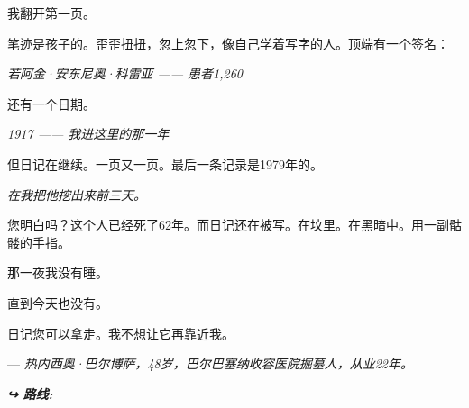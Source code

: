 \noindent 我翻开第一页。

\noindent 笔迹是孩子的。歪歪扭扭，忽上忽下，像自己学着写字的人。顶端有一个签名：

\noindent \textit{若阿金·安东尼奥·科雷亚 —— 患者1,260}

\noindent 还有一个日期。

\noindent \textit{1917 —— 我进这里的那一年}

\noindent 但日记在继续。一页又一页。最后一条记录是1979年的。

\noindent \textit{在我把他挖出来前三天。}

\noindent 您明白吗？这个人已经死了62年。而日记还在被写。在坟里。在黑暗中。用一副骷髅的手指。

\noindent 那一夜我没有睡。

\noindent 直到今天也没有。

\noindent 日记您可以拿走。我不想让它再靠近我。

\noindent --- \textit{热内西奥·巴尔博萨，48岁，巴尔巴塞纳收容医院掘墓人，从业22年。}

\vspace{0.5em}
\noindent\textit{\textbf{↪ 路线:}  \rotasep {}}
